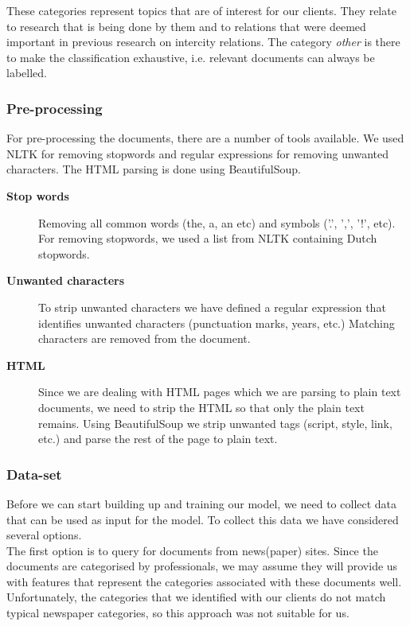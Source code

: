 These categories represent topics that are of interest for our clients. They relate to research that is being done by them and to relations that were deemed important in previous research on intercity relations. The category \textit{other} is there to make the classification exhaustive, i.e. relevant documents can always be labelled.

\subsubsection{Pre-processing}
For pre-processing the documents, there are a number of tools available. We used NLTK \cite{nlkt_stemming} for removing stopwords and regular expressions for removing unwanted characters. The HTML parsing is done using BeautifulSoup.

\begin{description}
\item[\textbf{Stop words}]
Removing all common words (the, a, an etc) and symbols ('.', ',', '!', etc). For removing stopwords, we used a list from NLTK containing Dutch stopwords.

\item[\textbf{Unwanted characters}]
To strip unwanted characters we have defined a regular expression that identifies unwanted characters (punctuation marks, years, etc.) Matching characters are removed from the document. 

\item[\textbf{HTML}]
Since we are dealing with HTML pages which we are parsing to plain text documents, we need to strip the HTML so that only the plain text remains. Using BeautifulSoup we strip unwanted tags (script, style, link, etc.) and parse the rest of the page to plain text.
\end{description}

\subsubsection{Data-set}
Before we can start building up and training our model, we need to collect data that can be used as input for the model. To collect this data we have considered several options.\\

The first option is to query for documents from news(paper) sites. Since the documents are categorised by professionals, we may assume they will provide us with features that represent the categories associated with these documents well.
Unfortunately, the categories that we identified with our clients do not match typical newspaper categories, so this approach was not suitable for us.\\

